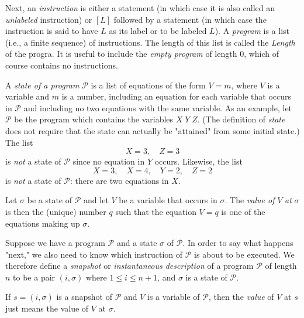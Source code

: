 \documentclass[a4paper,10pt,twoside]{book}
\begin{document}
Next, an \textit{instruction} is either a statement (in which case it is also called an \textit{unlabeled} instruction) or $[L]$ followed by a statement (in which case the instruction is said to have $L$ as its label or to be labeled $L$). A \textit{program} is a list (i.e., a finite sequence) of instructions. The length of this list is called the \textit{Length} of the progra. It is useful to include the \textit{empty program} of length 0, which of course contains no instructions.

A \textit{state of a program} $\mathscr{P}$ is a list of equations of the form $V=m$, where $V$ is a variable and $m$ is a number, including an equation for each variable that occurs in $\mathscr{P}$ and including no two equations with the same variable. As an example, let $\mathscr{P}$ be the program which contains the variables $X\;Y\;Z$. (The definition of \textit{state} does not require that the state can actually be "attained" from some initial state.) The list $$X=3,\quad Z=3$$ is \textit{not} a state of $\mathscr{P}$ since no equation in $Y$ occurs. Likewise, the list $$X=3,\quad X=4,\quad Y=2,\quad Z=2$$ is \textit{not} a state of $\mathscr{P}$: there are two equations in $X$.

Let $\sigma$ be a state of $\mathscr{P}$ and let $V$ be a variable that occurs in $\sigma$. The \textit{value of} $V$ \textit{at} $\sigma$ is then the (unique) number $q$ such that the equation $V=q$ is one of the equations making up $\sigma$.

Suppose we have a program $\mathscr{P}$ and a state $\sigma$ of $\mathscr{P}$. In order to say what happens "next," we also need to know which instruction of $\mathscr{P}$ is about to be executed. We therefore define a \textit{snapshot} or \textit{instantaneous description} of a program $\mathscr{P}$ of length $n$ to be a pair $(i,\sigma)$ where $1\le i\le n+1$, and $\sigma$ is a state of $\mathscr{P}$.

If $s=(i,\sigma)$ is a snapshot of $\mathscr{P}$ and $V$ is a variable of $\mathscr{P}$, then the \textit{value} of $V$ at $s$ just means the value of $V$ at $\sigma$.
\end{document}
